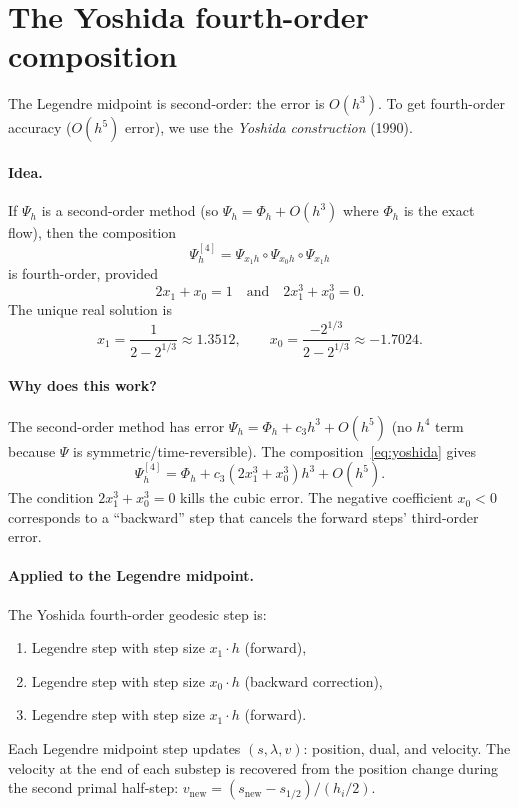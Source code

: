 \documentclass[11pt]{article}
\begin{document}
\section{The Yoshida fourth-order composition}

The Legendre midpoint is second-order: the error is $O(h^3)$.  To get
fourth-order accuracy ($O(h^5)$ error), we use the \emph{Yoshida
construction} (1990).

\paragraph{Idea.}
If $\Psi_h$ is a second-order method (so $\Psi_h = \Phi_h + O(h^3)$
where $\Phi_h$ is the exact flow), then the composition
\begin{equation}\label{eq:yoshida}
  \Psi_h^{[4]} = \Psi_{x_1 h} \circ \Psi_{x_0 h} \circ \Psi_{x_1 h}
\end{equation}
is fourth-order, provided
\[
  2x_1 + x_0 = 1 \quad \text{and} \quad 2x_1^3 + x_0^3 = 0.
\]
The unique real solution is
\[
  x_1 = \frac{1}{2 - 2^{1/3}} \approx 1.3512, \qquad
  x_0 = \frac{-2^{1/3}}{2 - 2^{1/3}} \approx -1.7024.
\]

\paragraph{Why does this work?}
The second-order method has error $\Psi_h = \Phi_h + c_3 h^3 + O(h^5)$
(no $h^4$ term because $\Psi$ is symmetric/time-reversible).  The
composition~\eqref{eq:yoshida} gives
\[
  \Psi_h^{[4]} = \Phi_h + c_3(2x_1^3 + x_0^3) h^3 + O(h^5).
\]
The condition $2x_1^3 + x_0^3 = 0$ kills the cubic error.  The
negative coefficient $x_0 < 0$ corresponds to a ``backward'' step
that cancels the forward steps' third-order error.

\paragraph{Applied to the Legendre midpoint.}
The Yoshida fourth-order geodesic step is:
\begin{enumerate}
  \item Legendre step with step size $x_1 \cdot h$ \quad (forward),
  \item Legendre step with step size $x_0 \cdot h$ \quad (backward correction),
  \item Legendre step with step size $x_1 \cdot h$ \quad (forward).
\end{enumerate}
Each Legendre midpoint step updates $(s, \lambda, v)$: position, dual, and
velocity.  The velocity at the end of each substep is recovered from
the position change during the second primal half-step:
$v_{\text{new}} = (s_{\text{new}} - s_{1/2}) / (h_i/2)$.
\end{document}
